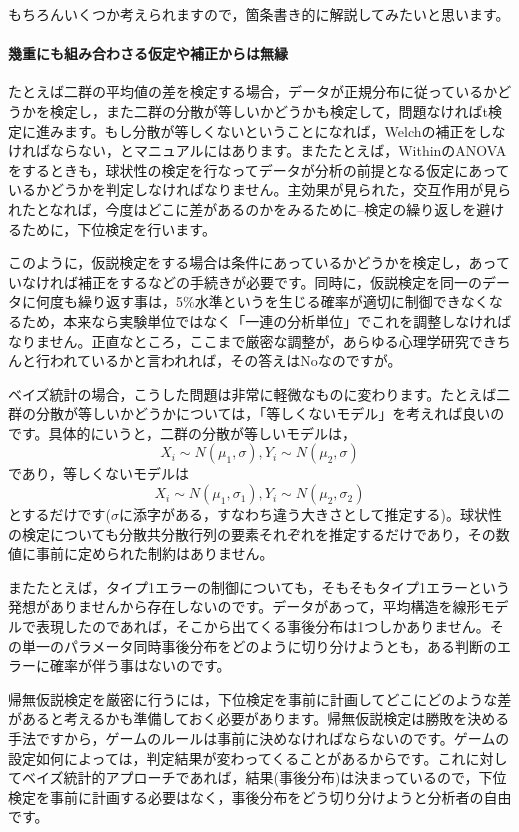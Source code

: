 \documentclass{ltjsbook}
\begin{document}
もちろんいくつか考えられますので，箇条書き的に解説してみたいと思います。

\paragraph{幾重にも組み合わさる仮定や補正からは無縁} たとえば二群の平均値の差を検定する場合，データが正規分布に従っているかどうかを検定し，また二群の分散が等しいかどうかも検定して，問題なければt検定に進みます。もし分散が等しくないということになれば，Welchの補正をしなければならない，とマニュアルにはあります。またたとえば，WithinのANOVAをするときも，球状性の検定を行なってデータが分析の前提となる仮定にあっているかどうかを判定しなければなりません。主効果が見られた，交互作用が見られたとなれば，今度はどこに差があるのかをみるために--検定の繰り返しを避けるために，下位検定を行います。

このように，仮説検定をする場合は条件にあっているかどうかを検定し，あっていなければ補正をするなどの手続きが必要です。同時に，仮説検定を同一のデータに何度も繰り返す事は，5\%水準というを生じる確率が適切に制御できなくなるため，本来なら実験単位ではなく「一連の分析単位」でこれを調整しなければなりません。正直なところ，ここまで厳密な調整が，あらゆる心理学研究できちんと行われているかと言われれば，その答えはNoなのですが。

ベイズ統計の場合，こうした問題は非常に軽微なものに変わります。たとえば二群の分散が等しいかどうかについては，「等しくないモデル」を考えれば良いのです。具体的にいうと，二群の分散が等しいモデルは，
$$ X_i \sim N(\mu_1,\sigma), Y_i \sim N(\mu_2,\sigma)$$
であり，等しくないモデルは
$$ X_i \sim N(\mu_1,\sigma_1), Y_i \sim N(\mu_2,\sigma_2)$$
とするだけです($\sigma$に添字がある，すなわち違う大きさとして推定する)。球状性の検定についても分散共分散行列の要素それぞれを推定するだけであり，その数値に事前に定められた制約はありません。

またたとえば，タイプ1エラーの制御についても，そもそもタイプ1エラーという発想がありませんから存在しないのです。データがあって，平均構造を線形モデルで表現したのであれば，そこから出てくる事後分布は1つしかありません。その単一のパラメータ同時事後分布をどのように切り分けようとも，ある判断のエラーに確率が伴う事はないのです。

帰無仮説検定を厳密に行うには，下位検定を事前に計画してどこにどのような差があると考えるかも準備しておく必要があります。帰無仮説検定は勝敗を決める手法ですから，ゲームのルールは事前に決めなければならないのです。ゲームの設定如何によっては，判定結果が変わってくることがあるからです。これに対してベイズ統計的アプローチであれば，結果(事後分布)は決まっているので，下位検定を事前に計画する必要はなく，事後分布をどう切り分けようと分析者の自由です。
\end{document}
